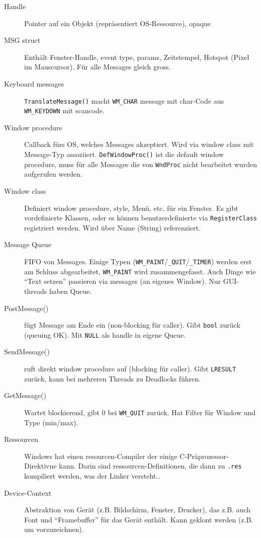 \documentclass[10pt,landscape,a4paper]{article}
\begin{document}
\begin{multicols*}{3}
\begin{description}
  \item[Handle] Pointer auf ein Objekt (repräsentiert OS-Ressource), opaque
  \item[MSG struct] Enthält Fenster-Handle, event type, params,
    Zeitstempel, Hotspot (Pixel im Mauscursor). Für alle Messages gleich gross.
  \item[Keyboard messages] \verb|TranslateMessage()| macht \verb|WM_CHAR|
    message mit char-Code aus \verb|WM_KEYDOWN| mit scancode.
  \item[Window procedure] Callback fürs OS, welches Messages akzeptiert. Wird
    via window class mit Message-Typ assoziiert. \verb|DefWindowProc()| ist die
    default window procedure, muss für alle Messages die von \verb|WndProc|
    nicht bearbeitet wurden aufgerufen werden.
  \item[Window class] Definiert window procedure, style, Menü, etc. für ein
    Fenster. Es gibt vordefinierte Klassen, oder es können benutzerdefinierte
    via \verb|RegisterClass| registriert werden. Wird über Name (String)
referenziert.
  \item[Message Queue] FIFO von Messages. Einige Typen
    (\verb|WM_PAINT|/\verb|_QUIT|/\verb|_TIMER|) werden erst am Schluss
    abgearbeitet, \verb|WM_PAINT| wird zusammengefasst. Auch Dinge wie ``Text
    setzen'' passieren via messages (an eigenes Window). Nur GUI-threads haben Queue.
   \item[PostMessage()] fügt Message am Ende ein (non-blocking für
     caller). Gibt \verb|bool| zurück (queuing OK). Mit \verb|NULL| als handle
     in eigene Queue.
   \item[SendMessage()] ruft direkt window procedure auf (blocking für
     caller). Gibt \verb|LRESULT| zurück, kann bei mehreren Threads zu Deadlocks führen.
   \item[GetMessage()] Wartet blockierend, gibt 0 bei \verb|WM_QUIT| zurück. Hat
     Filter für Window und Type (min/max).
   \item[Ressourcen] Windows hat einen resourcen-Compiler der einige
     C-Präprozessor-Direktivne kann. Darin sind ressourcen-Definitionen, die
     dann zu \verb|.res| kompiliert werden, was der Linker versteht..
   \item[Device-Context] Abstraktion von Gerät (z.B. Bildschirm, Fenster,
     Drucker), das z.B. auch Font und ``Framebuffer'' für das Gerät enthält.
     Kann geklont werden (z.B. um vorzuzeichnen).
\end{description}



\end{multicols*}
\end{document}

